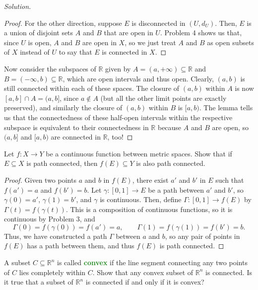 \documentclass[11pt]{scrartcl}
\providecommand{\RR}{\mathbb R}
\newenvironment{soln}{\begin{proof}[Solution]}{\end{proof}}
\providecommand{\vocab}[1]{{\textbf{\textcolor{ForestGreen}{#1}}}}
\begin{document}
\begin{soln}
\begin{proof}
		For the other direction, suppose $E$ is disconnected in $(U, d_U)$.
		Then, $E$ is a union of disjoint sets $A$ and $B$ that are open in $U$.
		Problem 4 shows us that, since $U$ is open, $A$ and $B$ are open in $X$,
		so we just treat $A$ and $B$ as open subsets of $X$ instead of $U$
		to say that $E$ is connected in $X$.
	\end{proof}

	Now consider the subspaces of $\RR$ given by
	$A = (a, +\infty)\subseteq\RR$ and $B = (-\infty, b)\subseteq\RR$,
	which are open intervals and thus open.
	Clearly, $(a, b)$ is still connected within each of these spaces.
	The closure of $(a, b)$ within $A$ is now $[a, b]\cap A = (a, b]$,
	since $a\notin A$ (but all the other limit points are exactly preserved),
	and similarly the closure of $(a, b)$ within $B$ is $[a, b)$.
	The lemma tells us that the connectedness of these half-open intervals
	within the respective subspace
	is equivalent to their connectedness in $\RR$ because $A$ and $B$ are open,
	so $(a, b]$ and $[a, b)$ are connected in $\RR$, too!
\end{soln}

\begin{problem}
	Let $f\colon X\to Y$ be a continuous function between metric spaces.
	Show that if $E\subseteq X$ is path connected,
	then $f(E)\subseteq Y$ is also path connected.
\end{problem}

\begin{proof}
	Given two points $a$ and $b$ in $f(E)$,
	there exist $a'$ and $b'$ in $E$ such that
	$f(a') = a$ and $f(b') = b$.
	Let $\gamma\colon[0,1]\to E$ be a path between $a'$ and $b'$,
	so $\gamma(0) = a'$, $\gamma(1) = b'$, and $\gamma$ is continuous.
	Then, define $\Gamma\colon[0,1]\to f(E)$ by
	$\Gamma(t) = f(\gamma(t))$. This is a composition of continuous functions,
	so it is continuous by Problem 3, and
	\[\Gamma(0) = f(\gamma(0)) = f(a') = a,\qquad
	\Gamma(1) = f(\gamma(1)) = f(b') = b.\]
	Thus, we have constructed a path $\Gamma$ between $a$ and $b$,
	so any pair of points in $f(E)$ has a path between them,
	and thus $f(E)$ is path connected.
\end{proof}

\begin{problem}
	A subset $C\subseteq \RR^n$ is called \vocab{convex} if
	the line segment connecting any two points of $C$
	lies completely within $C$.
	Show that any convex subset of $\RR^n$ is connected.
	Is it true that a subset of $\RR^n$ is connected if and only if
	it is convex?
\end{problem}
\end{document}
